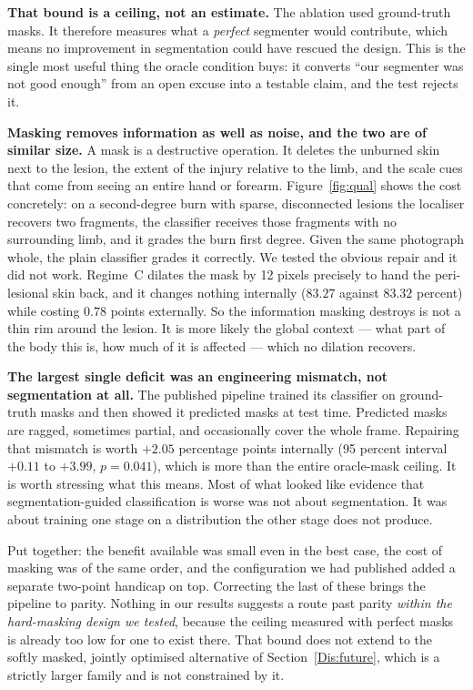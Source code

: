 \documentclass{melba}
\begin{document}
\textbf{That bound is a ceiling, not an estimate.} The ablation used ground-truth masks. It therefore measures what a \emph{perfect} segmenter would contribute, which means no improvement in segmentation could have rescued the design. This is the single most useful thing the oracle condition buys: it converts ``our segmenter was not good enough'' from an open excuse into a testable claim, and the test rejects it.

\textbf{Masking removes information as well as noise, and the two are of similar size.} A mask is a destructive operation. It deletes the unburned skin next to the lesion, the extent of the injury relative to the limb, and the scale cues that come from seeing an entire hand or forearm. Figure~\ref{fig:qual} shows the cost concretely: on a second-degree burn with sparse, disconnected lesions the localiser recovers two fragments, the classifier receives those fragments with no surrounding limb, and it grades the burn first degree. Given the same photograph whole, the plain classifier grades it correctly. We tested the obvious repair and it did not work. Regime~C dilates the mask by 12 pixels precisely to hand the peri-lesional skin back, and it changes nothing internally ($83.27$ against $83.32$ percent) while costing $0.78$ points externally. So the information masking destroys is not a thin rim around the lesion. It is more likely the global context --- what part of the body this is, how much of it is affected --- which no dilation recovers.

\textbf{The largest single deficit was an engineering mismatch, not segmentation at all.} The published pipeline trained its classifier on ground-truth masks and then showed it predicted masks at test time. Predicted masks are ragged, sometimes partial, and occasionally cover the whole frame. Repairing that mismatch is worth $+2.05$ percentage points internally (95 percent interval $+0.11$ to $+3.99$, $p=0.041$), which is more than the entire oracle-mask ceiling. It is worth stressing what this means. Most of what looked like evidence that segmentation-guided classification is worse was not about segmentation. It was about training one stage on a distribution the other stage does not produce.

Put together: the benefit available was small even in the best case, the cost of masking was of the same order, and the configuration we had published added a separate two-point handicap on top. Correcting the last of these brings the pipeline to parity. Nothing in our results suggests a route past parity \emph{within the hard-masking design we tested}, because the ceiling measured with perfect masks is already too low for one to exist there. That bound does not extend to the softly masked, jointly optimised alternative of Section~\ref{Dis:future}, which is a strictly larger family and is not constrained by it.
\end{document}

